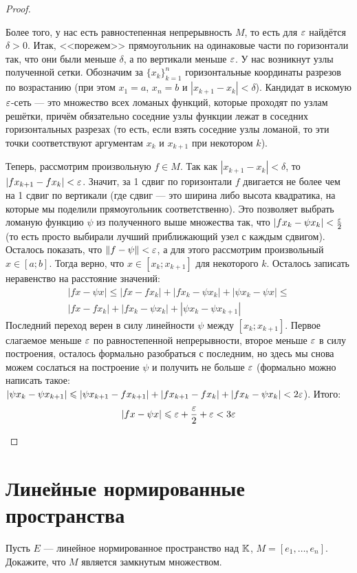 \begin{proof}
\begin{itemize}
		Более того, у нас есть равностепенная непрерывность $M$, то есть для $\varepsilon$ найдётся $\delta > 0$. Итак, <<порежем>> прямоугольник на одинаковые части по горизонтали так, что они были меньше $\delta$, а по вертикали меньше $\varepsilon$. У нас возникнут узлы полученной сетки. Обозначим за $\{x_k\}_{k = 1}^n$ горизонтальные координаты разрезов по возрастанию (при этом $x_1 = a$, $x_n = b$ и $|x_{k + 1} - x_k| < \delta$). Кандидат в искомую $\varepsilon$-сеть --- это множество всех ломаных функций, которые проходят по узлам решётки, причём обязательно соседние узлы функции лежат в соседних горизонтальных разрезах (то есть, если взять соседние узлы ломаной, то эти точки соответствуют аргументам $x_k$ и $x_{k + 1}$ при некотором $k$).
		
		Теперь, рассмотрим произвольную $f \in M$. Так как $|x_{k + 1} - x_k| < \delta$, то $|fx_{k + 1} - fx_k| < \varepsilon$. Значит, за 1 сдвиг по горизонтали $f$ двигается не более чем на 1 сдвиг по вертикали (где сдвиг --- это ширина либо высота квадратика, на которые мы поделили прямоугольник соответственно). Это позволяет выбрать ломаную функцию $\psi$ из полученного выше множества так, что $|fx_k - \psi x_k| < \frac{\varepsilon}{2}$ (то есть просто выбирали лучший приближающий узел с каждым сдвигом). Осталось показать, что $\|f - \psi\| < \varepsilon$, а для этого рассмотрим произвольный $x \in [a; b]$. Тогда верно, что $x \in [x_k; x_{k + 1}]$ для некоторого $k$. Осталось записать неравенство на расстояние значений:
		\begin{multline*}
			|fx - \psi x| \le |fx - fx_k| + |fx_k - \psi x_k| + |\psi x_k - \psi x| \le
			\\
			|fx - fx_k| + |fx_k - \psi x_k| + |\psi x_k - \psi x_{k + 1}|
		\end{multline*}
		Последний переход верен в силу линейности $\psi$ между $[x_k; x_{k + 1}]$. Первое слагаемое меньше $\varepsilon$ по равностепенной непрерывности, второе меньше $\varepsilon$ в силу построения, осталось формально разобраться с последним, но здесь мы снова можем сослаться на построение $\psi$ и получить не больше $\varepsilon$ (формально можно написать такое: $|\psi x_k - \psi x_{k + 1}| \leqslant |\psi x_{k + 1} - fx_{k + 1}| + |fx_{k + 1} - fx_k| + |fx_k - \psi x_k| < 2\varepsilon$). Итого:
		\[
			|fx - \psi x| \leqslant \varepsilon + \frac{\varepsilon}{2} + \varepsilon < 3\varepsilon
		\]
	\end{itemize}
\end{proof}

\section{Линейные нормированные пространства}

\begin{exercise}
	Пусть $E$ --- линейное нормированное пространство над $\mathbb{K}$, $M = [e_1, \ldots, e_n]$. Докажите, что $M$ является замкнутым множеством.
\end{exercise}